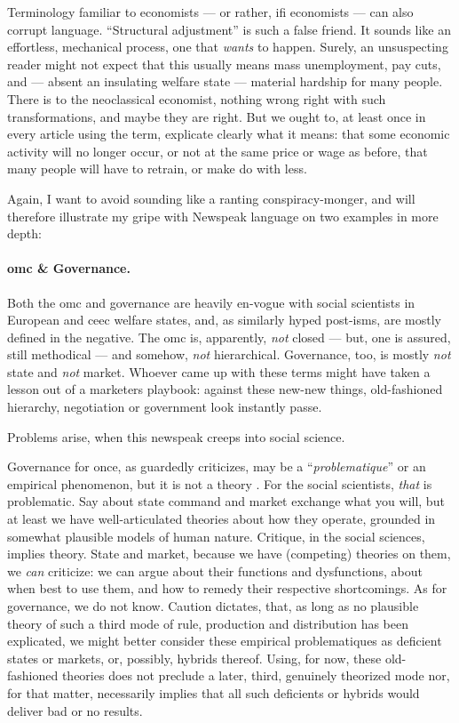 Terminology familiar to economists --- or rather, \gls{ifi} economists --- can also corrupt language.
``Structural adjustment'' \citep[for example,][19]{Begg2008} is such a false friend.
It sounds like an effortless, mechanical process, one that \emph{wants} to happen.
Surely, an unsuspecting reader might not expect that this usually means mass unemployment, pay cuts, and --- absent an insulating welfare state --- material hardship for many people.
There is to the neoclassical economist, nothing wrong right with such transformations, and maybe they are right.
But we ought to, at least once in every article using the term, explicate clearly what it means:
that some economic activity will no longer occur, or not at the same price or wage as before, that many people will have to retrain, or make do with less.

Again, I want to avoid sounding like a ranting conspiracy-monger, and will therefore illustrate my gripe with Newspeak language on two examples in more depth:

\paragraph{\gls{omc} \& Governance.}
Both the \gls{omc} and governance are heavily en-vogue with social scientists in European and \gls{ceec} welfare states, and, as similarly hyped post-isms, are mostly defined in the negative.
The \gls{omc} is, apparently, \emph{not} closed --- but, one is assured, still methodical --- and somehow, \emph{not} hierarchical.
Governance, too, is mostly \emph{not} state and \emph{not} market.
Whoever came up with these terms might have taken a lesson out of a marketers playbook:
against these new-new things, old-fashioned hierarchy, negotiation or government look instantly passe.

Problems arise, when this newspeak creeps into social science.

Governance for once, as \citeauthor{Jachtenfuchs2001} guardedly criticizes, may be a ``\emph{problematique}'' or an empirical phenomenon, but it is not a theory \citeyearpar[259]{Jachtenfuchs2001}.
For the social scientists, \emph{that} is problematic.
Say about state command and market exchange what you will, but at least we have well-articulated theories about how they operate, grounded in somewhat plausible models of human nature.
Critique, in the social sciences, implies theory.
State and market, because we have (competing) theories on them, we \emph{can} criticize:
we can argue about their functions and dysfunctions, about when best to use them, and how to remedy their respective shortcomings.
As for governance, we do not know.
Caution dictates, that, as long as no plausible theory of such a third mode of rule, production and distribution has been explicated, we might better consider these empirical problematiques as deficient states or markets, or, possibly, hybrids thereof.
Using, for now, these old-fashioned theories does not preclude a later, third, genuinely theorized mode nor, for that matter, necessarily implies that all such deficients or hybrids would deliver bad or no results.

